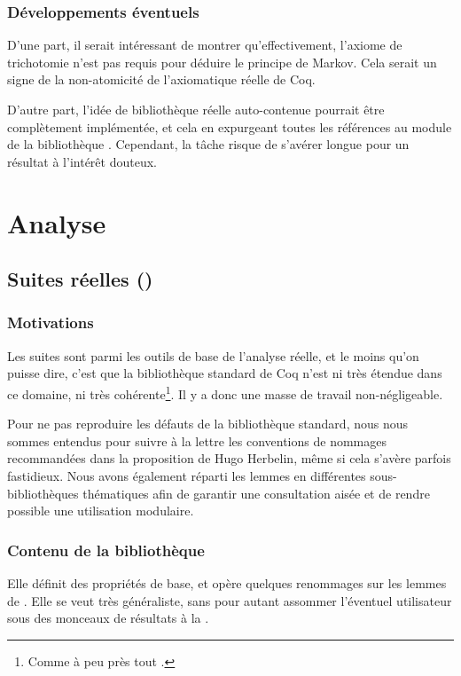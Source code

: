 \subsubsection{Développements éventuels}

D'une part, il serait intéressant de montrer qu'effectivement, l'axiome de trichotomie n'est pas requis pour déduire le principe de Markov. Cela serait un signe de la non-atomicité de l'axiomatique réelle de Coq.

D'autre part, l'idée de bibliothèque réelle auto-contenue pourrait être complètement implémentée, et cela en expurgeant toutes les références au module  de la bibliothèque . Cependant, la tâche risque de s'avérer longue pour un résultat à l'intérêt douteux.

\section{Analyse}

\subsection{Suites réelles ()}

\subsubsection{Motivations}

Les suites sont parmi les outils de base de l'analyse réelle, et le moins qu'on puisse dire, c'est que la bibliothèque standard de Coq n'est ni très étendue dans ce domaine, ni très cohérente\footnote{Comme à peu près tout .}. Il y a donc une masse de travail non-négligeable.

Pour ne pas reproduire les défauts de la bibliothèque standard, nous nous sommes entendus pour suivre à la lettre les conventions de nommages recommandées dans la proposition de Hugo Herbelin\cite{naming_conventions}, même si cela s'avère parfois fastidieux. Nous avons également réparti les lemmes en différentes sous-bibliothèques thématiques afin de garantir une consultation aisée et de rendre possible une utilisation modulaire.

\subsubsection{Contenu de la bibliothèque}

Elle définit des propriétés de base, et opère quelques renommages sur les lemmes de . Elle se veut très généraliste, sans pour autant assommer l'éventuel utilisateur sous des monceaux de résultats à la .

